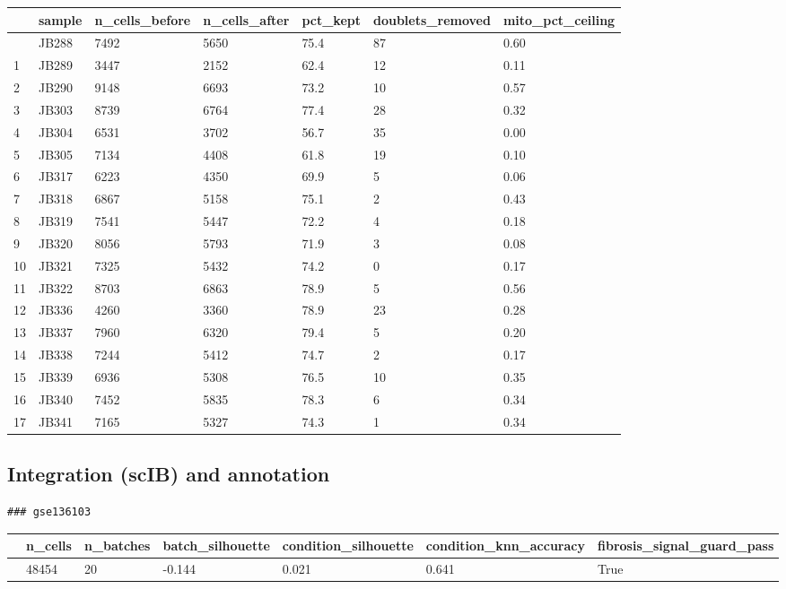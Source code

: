 \documentclass[
  letterpaper,
  DIV=11,
  numbers=noendperiod]{scrartcl}
\newcounter{none} %
\begin{document}
{\def\LTcaptype{none} %
\begin{longtable}[]{@{}lllllll@{}}
\toprule\noalign{}
& sample & n\_cells\_before & n\_cells\_after & pct\_kept &
doublets\_removed & mito\_pct\_ceiling \\
\midrule\noalign{}
\endhead
\bottomrule\noalign{}
\endlastfoot
0 & JB288 & 7492 & 5650 & 75.4 & 87 & 0.60 \\
1 & JB289 & 3447 & 2152 & 62.4 & 12 & 0.11 \\
2 & JB290 & 9148 & 6693 & 73.2 & 10 & 0.57 \\
3 & JB303 & 8739 & 6764 & 77.4 & 28 & 0.32 \\
4 & JB304 & 6531 & 3702 & 56.7 & 35 & 0.00 \\
5 & JB305 & 7134 & 4408 & 61.8 & 19 & 0.10 \\
6 & JB317 & 6223 & 4350 & 69.9 & 5 & 0.06 \\
7 & JB318 & 6867 & 5158 & 75.1 & 2 & 0.43 \\
8 & JB319 & 7541 & 5447 & 72.2 & 4 & 0.18 \\
9 & JB320 & 8056 & 5793 & 71.9 & 3 & 0.08 \\
10 & JB321 & 7325 & 5432 & 74.2 & 0 & 0.17 \\
11 & JB322 & 8703 & 6863 & 78.9 & 5 & 0.56 \\
12 & JB336 & 4260 & 3360 & 78.9 & 23 & 0.28 \\
13 & JB337 & 7960 & 6320 & 79.4 & 5 & 0.20 \\
14 & JB338 & 7244 & 5412 & 74.7 & 2 & 0.17 \\
15 & JB339 & 6936 & 5308 & 76.5 & 10 & 0.35 \\
16 & JB340 & 7452 & 5835 & 78.3 & 6 & 0.34 \\
17 & JB341 & 7165 & 5327 & 74.3 & 1 & 0.34 \\
\end{longtable}
}

\subsection{Integration (scIB) and
annotation}\label{integration-scib-and-annotation}

\begin{verbatim}
### gse136103
\end{verbatim}

{\def\LTcaptype{none} %
\begin{longtable}[]{@{}lllllll@{}}
\toprule\noalign{}
& n\_cells & n\_batches & batch\_silhouette & condition\_silhouette &
condition\_knn\_accuracy & fibrosis\_signal\_guard\_pass \\
\midrule\noalign{}
\endhead
\bottomrule\noalign{}
\endlastfoot
0 & 48454 & 20 & -0.144 & 0.021 & 0.641 & True \\
\end{longtable}
}
\end{document}
